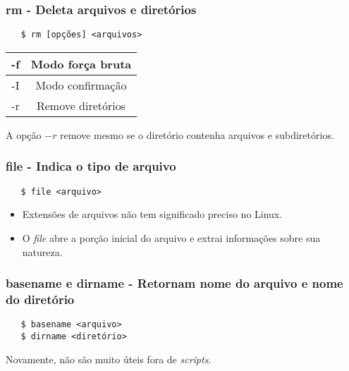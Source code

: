 \documentclass{beamer}
\begin{document}
\begin{frame}[fragile]
   \frametitle{rm - Deleta arquivos e diretórios}
   \begin{verbatim}
   $ rm [opções] <arquivos>
   \end{verbatim}
   \begin{table}
      \begin{tabular}{ c | c }
         -f & Modo força bruta \\
         \hline 
         -I & Modo confirmação \\
         \hline
         -r & Remove diretórios \\
      \end{tabular}
   \end{table}
   A opção $-r$ remove mesmo se o diretório contenha arquivos e subdiretórios.
\end{frame}

\begin{frame}[fragile]
   \frametitle{file - Indica o tipo de arquivo}
   \begin{verbatim}
   $ file <arquivo>
   \end{verbatim}
   \begin{itemize}
      \item Extensões de arquivos não tem significado preciso no Linux.
      \item O \textit{file} abre a porção inicial do arquivo e extrai informações sobre sua natureza.
   \end{itemize}
\end{frame}

\begin{frame}[fragile]
   \frametitle{basename e dirname - Retornam nome do arquivo e nome do diretório}
   \begin{verbatim}
   $ basename <arquivo> 
   $ dirname <diretório>
   \end{verbatim}
   Novamente, não são muito úteis fora de \textit{scripts}.
\end{frame}
\end{document}
